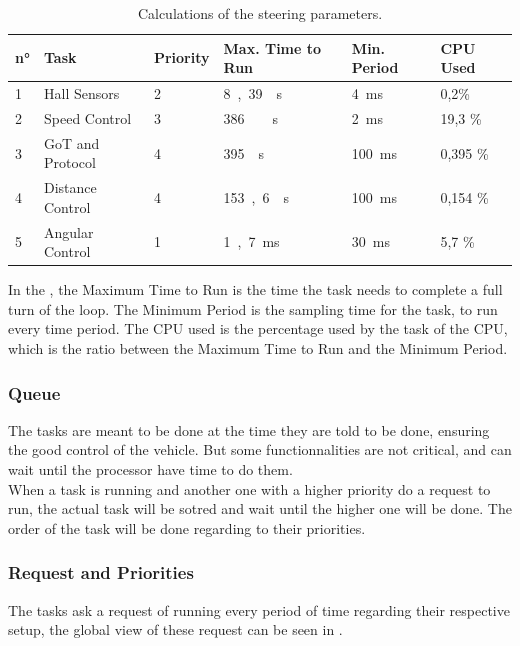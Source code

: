 \begin{table} [H]
	\begin{tabular}{|l|l|l|l|l|l|}
								
\hline
\textbf{n°}  & \textbf{Task}   	 & \textbf{Priority}	& \textbf{Max. Time to Run} 	& \textbf{Min. Period} & \textbf{CPU Used}\\
\hline
1			 &	Hall Sensors	 & 2				&	\si{8,39 \mu s}			    &	\si{4 ms}			  & 0,2\%	  \\
\hline
2			 &	Speed Control	 & 3				&	\si{386\ \mu s}				&	\si{2 ms}			  &	19,3 \%   \\
\hline
3			 &	GoT and Protocol & 4				&	\si{395 \mu s}			    &	\si{100 ms}			  &	0,395 \%  \\
\hline
4			 &	Distance Control & 4				&	\si{153,6 \mu s} 			&	\si{100 ms} 	  	  &	0,154 \%  \\
\hline
5			 &	Angular Control	 & 1				&	\si{1,7  ms}			    &	\si{30 ms}			  &	5,7 \%    \\
\hline		
	\end{tabular}
	\caption{Calculations of the steering parameters.}	
	\label{scheduleParameters}						
\end{table}	

In the , the Maximum Time to Run is the time the task needs to complete a full turn of the loop. The Minimum Period is the sampling time for the task, to run every time period. The CPU used is the percentage used by the task of the CPU, which is the ratio between the Maximum Time to Run and the Minimum Period.

\subsubsection{Queue}
The tasks are meant to be done at the time they are told to be done, ensuring the good control of the vehicle. But some functionnalities are not critical, and can wait until the processor have time to do them.\\
When a task is running and another one with a higher priority do a request to run, the actual task will be sotred and wait until the higher one will be done. The order of the task will be done regarding to their priorities.


\subsubsection{Request and Priorities}
The tasks ask a request of running every period of time regarding their respective setup, the global view of these request can be seen in .

